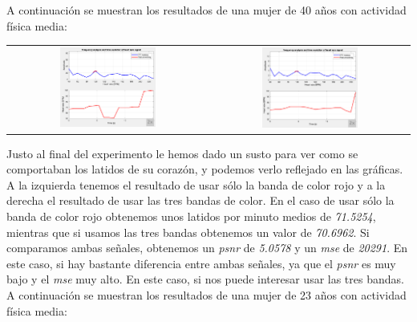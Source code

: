 \documentclass[11pt]{article}
\begin{document}
A continuación se muestran los resultados de una mujer de 40 años con actividad física media:

\begin{table}[H]
	\centering
	\begin{tabular}{cc}
		\includegraphics[width=0.5\textwidth]{images/sujeto2_R.png} & \includegraphics[width=0.5\textwidth]{images/sujeto2_RGB.png}
	\end{tabular}
\end{table}

Justo al final del experimento le hemos dado un susto para ver como se comportaban los latidos de su corazón, y podemos verlo reflejado en las gráficas. A la izquierda tenemos el resultado de usar sólo la banda de color rojo y a la derecha el resultado de usar las tres bandas de color. En el caso de usar sólo la banda de color rojo obtenemos unos latidos por minuto medios de \textit{71.5254}, mientras que si usamos las tres bandas obtenemos un valor de \textit{70.6962}. Si comparamos ambas señales, obtenemos un \textit{psnr} de \textit{5.0578} y un \textit{mse} de \textit{20291}. En este caso, si hay bastante diferencia entre ambas señales, ya que el \textit{psnr} es muy bajo y el \textit{mse} muy alto. En este caso, si nos puede interesar usar las tres bandas. \\

A continuación se muestran los resultados de una mujer de 23 años con actividad física media:
\end{document}

